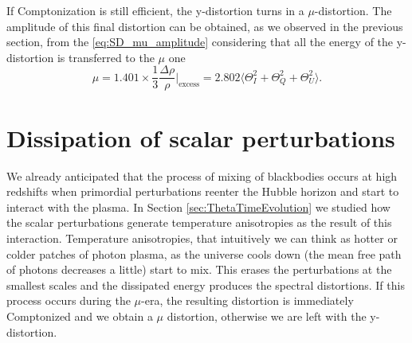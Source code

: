 If Comptonization is still efficient, the y-distortion turns in a $\mu$-distortion. The amplitude of this final distortion can be obtained, as we observed in the previous section, from the \eqref{eq:SD_mu_amplitude} considering that all the energy of the y-distortion is transferred to the $\mu$ one
\begin{equation}
    \label{eq:mu-distortion_polarized}
    \mu=1.401\times\frac{1}{3}\frac{\Delta\rho}{\rho}\bigg|_\text{excess}=2.802\Big\langle\Theta^2_I+\Theta^2_Q+\Theta^2_U\Big\rangle.
\end{equation}

\section{Dissipation of scalar perturbations}
\label{sec:diss_scalar}
We already anticipated that the process of mixing of blackbodies occurs at high redshifts when primordial perturbations reenter the Hubble horizon and start to interact with the plasma. In Section \ref{sec:ThetaTimeEvolution} we studied how the scalar perturbations generate temperature anisotropies as the result of this interaction. Temperature anisotropies, that intuitively we can think as hotter or colder patches of photon plasma, as the universe cools down (the mean free path of photons decreases a little) start to mix. This erases the perturbations at the smallest scales and the dissipated energy produces the spectral distortions. If this process occurs during the $\mu$-era, the resulting distortion is immediately Comptonized and we obtain a $\mu$ distortion, otherwise we are left with the y-distortion.

